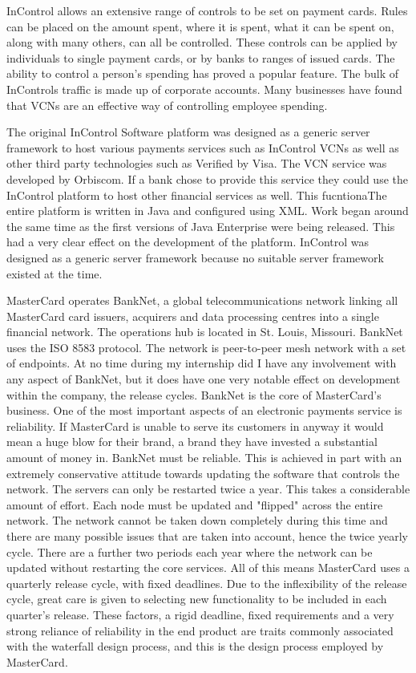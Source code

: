 \documentclass[a4paper, 11pt, titlepage]{article}
\begin{document}
InControl allows an extensive range of controls to be set on payment cards. Rules can be placed on the amount spent, where it is spent, what it can be spent on, along with many others, can all be controlled. These controls can be applied by individuals to single payment cards, or by banks to ranges of issued cards. The ability to control a person’s spending has proved a popular feature. The bulk of InControls traffic is made up of corporate accounts. Many businesses have found that VCNs are an effective way of controlling employee spending.  
 
The original InControl Software platform was designed as a generic server framework to host various payments services such as InControl VCNs as well as other third party technologies such as Verified by Visa. The VCN service was developed by Orbiscom. If a bank chose to provide this service they could use the InControl platform to host other financial services as well. This fucntionaThe entire platform is written in Java and configured using XML. Work began around the same time as the first versions of Java Enterprise were being released. This had a very clear effect on the development of the platform. InControl was designed as a generic server framework because no suitable server framework existed at the time. 
 
MasterCard operates BankNet, a global telecommunications network linking all MasterCard card issuers, acquirers and data processing centres into a single financial network. The operations hub is located in St. Louis, Missouri. BankNet uses the ISO 8583 protocol. The network is peer-to-peer mesh network with a set of endpoints. At no time during my internship did I have any involvement with any aspect of BankNet, but it does have one very notable effect on development within the company, the release cycles. BankNet is the core of MasterCard’s business. One of the most important aspects of an electronic payments service is reliability. If MasterCard is unable to serve its customers in anyway it would mean a huge blow for their brand, a brand they have invested a substantial amount of money in. BankNet must be reliable. This is achieved in part with an extremely conservative attitude towards updating the software that controls the network. The servers can only be restarted twice a year. This takes a considerable amount of effort. Each node must be updated and "flipped" across the entire network. The network cannot be taken down completely during this time and there are many possible issues that are taken into account, hence the twice yearly cycle. There are a further two periods each year where the network can be updated without restarting the core services. All of this means MasterCard uses a quarterly release cycle, with fixed deadlines. Due to the inflexibility of the release cycle, great care is given to selecting new functionality to be included in each quarter’s release. These factors, a rigid deadline, fixed requirements and a very strong reliance of reliability in the end product are traits commonly associated with the waterfall design process, and this is the design process employed by MasterCard. 
 
\end{document}
